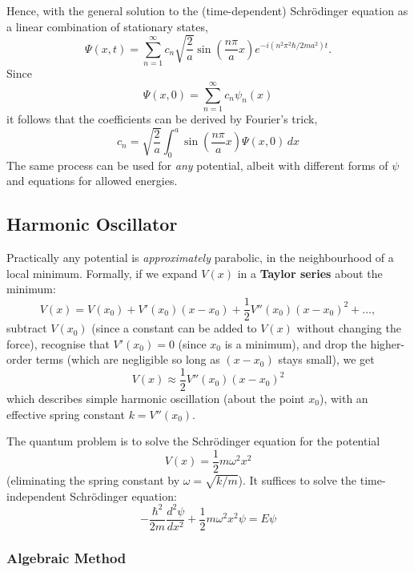 \documentclass{article}
\begin{document}
Hence, with the general solution to the (time-dependent) Schr\"{o}dinger
equation as a linear combination of stationary states, \[
  \Psi(x, t) = \sum_{n = 1}^{\infty}
    c_n\sqrt{\frac{2}{a}} \sin\left(\frac{n\pi}{a}x\right)
    e^{-i(n^2\pi^2\hbar/2ma^2)t}.
\] Since \[
  \Psi(x, 0) = \sum_{n = 1}^{\infty} c_n\psi_n(x)
  \] it follows that the coefficients can be derived by Fourier's trick, \[
  c_n = \sqrt{\frac{2}{a}} \int_0^a
    \sin\left(\frac{n\pi}{a}x\right) \Psi(x, 0)
  \,dx
\] The same process can be used for \emph{any} potential, albeit with different
forms of $\psi$ and equations for allowed energies.

\subsection{Harmonic Oscillator}

Practically any potential is \emph{approximately} parabolic, in the
neighbourhood of a local minimum. Formally, if we expand $V(x)$ in a
\textbf{Taylor series} about the minimum: \[
  V(x) = V(x_0) + V'(x_0)(x - x_0) + \frac{1}{2}V''(x_0)(x - x_0)^2 + \ldots,
\] subtract $V(x_0)$ (since a constant can be added to $V(x)$ without changing
the force), recognise that $V'(x_0) = 0$ (since $x_0$ is a minimum), and drop
the higher-order terms (which are negligible so long as $(x - x_0)$ stays
small), we get \[
  V(x) \approx \frac{1}{2}V''(x_0)(x - x_0)^2
\] which describes simple harmonic oscillation (about the point $x_0$), with an
effective spring constant $k = V''(x_0)$.

The quantum problem is to solve the Schr\"{o}dinger equation for the potential
\begin{equation} \label{eq:har-osc}
  V(x) = \frac{1}{2} m \omega^2 x^2
\end{equation}
(eliminating the spring constant by $\omega = \sqrt{k/m}$). It suffices to
solve the time-independent Schr\"{o}dinger equation:
\begin{equation} \label{eq:har-osc-1}
  -\frac{\hbar^2}{2m} \frac{d^2\psi}{dx^2} + \frac{1}{2}m\omega^2x^2\psi
  = E\psi
\end{equation}

\subsubsection{Algebraic Method}
\end{document}
